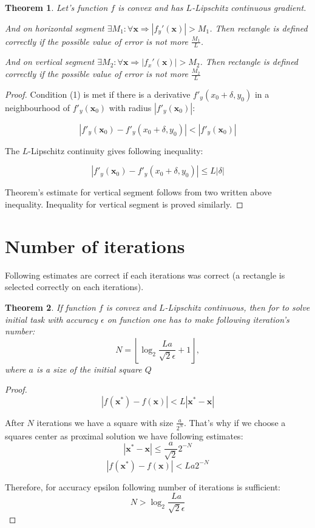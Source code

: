 \documentclass[12pt]{article}
\newtheorem{theorem}{Theorem}[section]
\begin{document}
\begin{theorem}
Let's function $f$ is convex and has $L$-Lipschitz continuous gradient. 

And on horizontal segment $\exists M_1  : \forall \textbf{x}\Rightarrow|f_y'(\textbf{x})| > M_1$. Then rectangle is defined correctly if the possible value of error is not more $\frac{M_1}{L}$.

And on vertical segment $\exists M_2  : \forall \textbf{x}\Rightarrow|f_x'(\textbf{x})| > M_2$. Then rectangle is defined correctly if the possible value of error is not more $\frac{M_2}{L}$
\end{theorem}
\begin{proof}
Condition (1) is met if there is a derivative $f'_y(x_0+\delta, y_0)$ in a neighbourhood of 
$f'_y(\textbf{x}_0)$ with radius $\left|f'_y(\textbf{x}_0)\right|$:

$$\left|f'_y(\textbf{x}_0) - f'_y(x_0+\delta, y_0)\right|<\left|f'_y(\textbf{x}_0)\right|$$

The $L$-Lipschitz continuity gives following inequality:

$$\left|f'_y(\textbf{x}_0) - f'_y(x_0+\delta, y_0)\right| \leq L|\delta|$$

Theorem's estimate for vertical segment follows from two written above inequality. Inequality for vertical segment is proved similarly.
\end{proof}

\section{Number of iterations}

Following estimates are correct if each iterations was correct (a rectangle is selected correctly on each iterations).

\begin{theorem}
If function $f$ is convex and $L$-Lipschitz continuous, then for to solve initial task with accuracy $\epsilon$ on function one has to make following iteration's number:
$$N = \left\lfloor\log_2\frac{La}{\sqrt{2}\epsilon} + 1\right\rfloor,$$
where $a$ is a size of the initial square $Q$
\end{theorem}
\begin{proof}
$$|f(\textbf{x}^*) - f(\textbf{x})| < L|\textbf{x}^* - \textbf{x}|$$

After $N$ iterations we have a square with size $\frac{a}{2^N}$. That's why if we choose a squares center as proximal solution we have following estimates:
$$|\textbf{x}^* - \textbf{x}| \leq \frac{a}{\sqrt{2}}2^{-N}$$
$$|f(\textbf{x}^*) - f(\textbf{x})| < La2^{-N}$$

Therefore, for accuracy epsilon following number of iterations is sufficient:
$$N > \log_2\frac{La}{\sqrt{2}\epsilon}$$

\end{proof}
\end{document}
